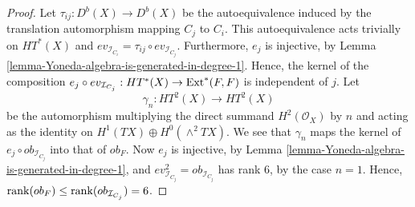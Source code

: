 \documentclass[12pt]{amsart}
\newcommand{\hide}[1]{}
\numberwithin{equation}{subsection}
\theoremstyle{plain}
\theoremstyle{definition}
\newcommand{\RightArrowOf}[1]{\stackrel{#1}{\rightarrow}}
\newcommand{\StructureSheaf}[1]{{\mathcal O}_{#1}}
\newcommand{\rank}{{\rm rank}}
\newcommand{\Ext}{{\rm Ext}}
\newcommand{\SheafExt}{{\mathcal E}xt}
\newcommand{\Ideal}[1]{{\mathcal I}_{#1}}
\begin{document}
\begin{proof}
Let $\tau_{ij}:D^b(X)\rightarrow D^b(X)$ be the autoequivalence induced by the translation automorphism mapping $C_j$ to $C_i$. This autoequivalence 
acts trivially on $HT^*(X)$ and $ev_{\Ideal{C_i}}=\tau_{ij}\circ ev_{\Ideal{C_j}}$. Furthermore, $e_j$ is injective, by Lemma \ref{lemma-Yoneda-algebra-is-generated-in-degree-1}.
Hence, the kernel of the composition $e_j\circ ev_{\Ideal{C_j}}:HT^*(X)\rightarrow \Ext^*(F,F)$
is independent of $j$. 
Let
\[
\gamma_n: HT^2(X)\rightarrow HT^2(X)
\]
be the automorphism multiplying the direct summand $H^2(\StructureSheaf{X})$ by $n$ and acting as the identity on 
$H^1(TX)\oplus H^0(\wedge^2TX)$. We see that $\gamma_n$ maps the kernel of $e_j\circ ob_{\Ideal{C_j}}$
 into that of $ob_F$. Now $e_j$ is injective, by Lemma \ref{lemma-Yoneda-algebra-is-generated-in-degree-1}, and $ev_{\Ideal{C_j}}^2=ob_{\Ideal{C_j}}$ has rank $6$, by the case $n=1$. Hence, $\rank(ob_F)\leq\rank(ob_{\Ideal{C_j}})=6$.
\hide{
We already know that $\rank(ob_F)\geq 6$, by Lemma \ref{lemma-rank-of-ob-F-is-at-least-6}.
It remains to prove that $\rank(ob_F)\leq 6$.

If $n=1$, then $\dim\Ext^2(F,F)=6$, by Lemma \ref{lemma-dim-Ext-1-F-F-is-3n+3}, and  so $\rank(ob_F)= 6$.
In this case $ev_F^1$ is surjective and so $ev_F$ is surjective, as both algebras $HH^*(X)$ and $\Ext^*(F,F)$ are generated in degree $1$ (for the latter use Lemma \ref{lemma-Yoneda-algebra-is-generated-in-degree-1}). 

Consider the composition
\[
H^0(TX)\rightarrow HT^1(X)\RightArrowOf{HKR} HH^1(X)\RightArrowOf{ev_F^1} \Ext^1(E,E)\rightarrow H^0(\SheafExt^1(F,F))%
\]
where the first arrow is the natural inclusion, the second is the HKR-isomorphism, the third is $ev_F^1$, and the fourth is the the natural global to local homomorphism. We have the isomorphism 
$\SheafExt^1(F,F)\cong N_{\cup_{i=1}^n C_i/X}$. 
The image of the above composition 
is induced by the sheaf homomorphism $TX\rightarrow N_{\cup_{i=1}^n C_i/X}$. It follows that the image of 

\[
HH^1(X)\RightArrowOf{ev_F^1} \Ext^1(E,E)\rightarrow H^0(\SheafExt^1(F,F))\cong \oplus_{i=1}^n H^0(N_{C_i/X})
\]
is equal to the image of $H^0(X,TX)$ via the diagonal evaluation. 

}
\end{proof}
\end{document}
